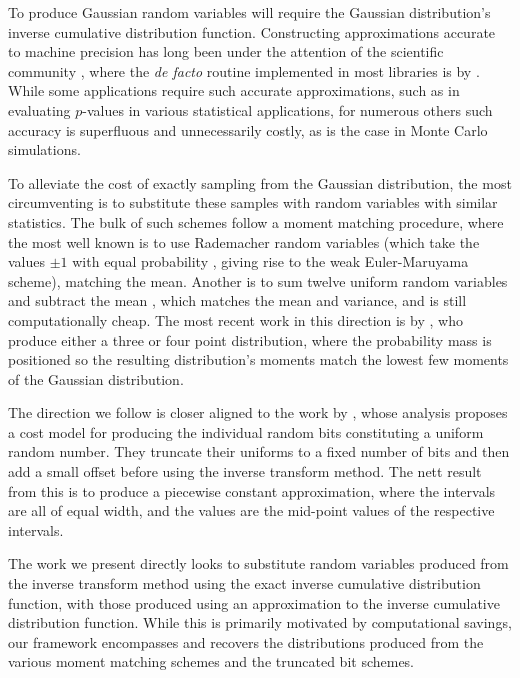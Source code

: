 \documentclass[manuscript,review]{acmart}
\begin{document}
To produce Gaussian random variables will require the Gaussian distribution's inverse cumulative distribution function. Constructing approximations accurate to machine precision has long been under the attention of the scientific community \citep{hastings1955approximations,evans1974algorithm70,beasley1985percentage,wichura1988algorithm,marsaglia1994rapid,giles2011approximating}, where the \textit{de facto} routine implemented in most libraries is by \citet{wichura1988algorithm}. While some applications require such accurate approximations, such as in evaluating $ p $-values in various statistical applications, for numerous others such accuracy is superfluous and unnecessarily costly, as is the case in Monte Carlo simulations. 

To alleviate the cost of exactly sampling from the Gaussian distribution, the most circumventing is to substitute these samples with random variables with similar statistics. The bulk of such schemes follow a moment matching procedure, where the most well known is to use Rademacher random variables (which take the values $ \pm 1 $ with equal probability \citep[page~XXXII]{kloeden1999numerical}, giving rise to the weak Euler-Maruyama scheme), matching the mean. Another is to sum twelve uniform random variables and subtract the mean \citep[page~500]{munk2011fixed}, which matches the mean and variance, and is still computationally cheap. The most recent work in this direction is by \citet{muller2015improving}, who produce either a three or four point distribution, where the probability mass is positioned so the resulting distribution's moments match the lowest few moments of the Gaussian distribution. 

The direction we follow is closer aligned to the work by \citet{giles2019random_quadrature,giles2019random_multilevel}, whose analysis proposes a cost model for producing the individual random bits constituting a uniform random number. They truncate their uniforms to a fixed number of bits and then add a small offset before using the inverse transform method. The nett result from this is to produce a piecewise constant approximation, where the intervals are all of equal width, and the values are the mid-point values of the respective intervals. 

The work we present directly looks to substitute random variables produced from the inverse transform method using the exact inverse cumulative distribution function, with those produced using an approximation to the inverse cumulative distribution function. While this is primarily motivated by computational savings, our framework encompasses and recovers the distributions produced from the various moment matching schemes and the truncated bit schemes. 
\end{document}
